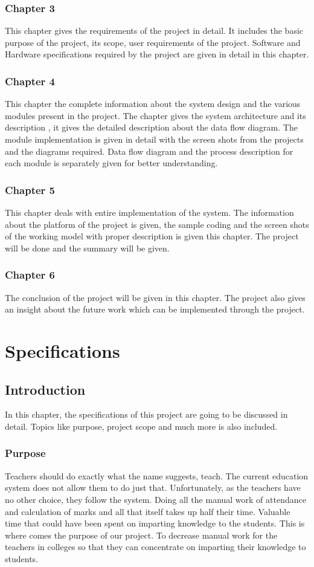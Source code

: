 \documentclass[BTech]{srmuthesis}
\begin{document}
\subsection*{Chapter 3}
This chapter gives the requirements of the project in detail. It includes the basic purpose of the project, its scope, user requirements of the project. Software and Hardware specifications required by the project are given in detail in this chapter.

\subsection*{Chapter 4}
This chapter the complete information about the system design and the various modules present in the project. The chapter gives the system architecture and its description , it gives the detailed description about the data flow diagram. The module implementation is given in detail with the screen shots from the projects and the diagrams required. Data flow diagram and the process description for each module is separately given for better understanding.

\subsection*{Chapter 5}
This chapter deals with entire implementation of the system. The information about the platform of the project is given, the sample coding and the screen shots of the working model with proper description is given this chapter. The project will be done and the summary will be given.

\subsection*{Chapter 6}
The conclusion of the project will be given in this chapter. The project also gives an insight
about the future work which can be implemented through the project.
\chapter{Specifications}
\section{Introduction}
In this chapter, the specifications of this project are going to be discussed in detail. Topics like purpose, project scope and much more is also included.
\subsection{Purpose}
Teachers should do exactly what the name suggests, teach. The current education system does not allow them to do just that. Unfortunately, as the teachers have no other choice, they follow the system. Doing all the manual work of attendance and calculation of marks and all that itself takes up half their time. Valuable time that could have been spent on imparting knowledge to the students. This is where comes the purpose of our project. To decrease manual work for the teachers in colleges so that they can concentrate on imparting their knowledge to students.
\end{document}
